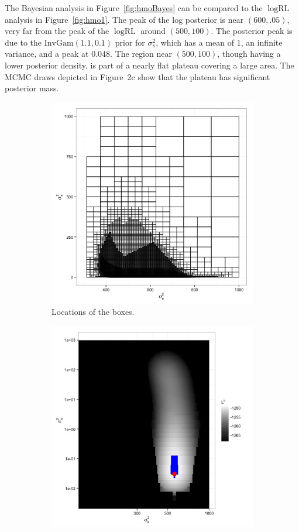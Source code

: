 \documentclass[ejs]{imsart}
\newcommand{\IG}{\text{InvGam}}
\newcommand{\RLorig}{\text{RL}}
\newcommand{\logRLorig}{\log\RLorig}
\newcommand{\sigssq}{\sigma_s^2}
\begin{document}
The Bayesian analysis in Figure~\ref{fig:hmoBayes} can be compared to the $\logRLorig$ analysis in Figure~\ref{fig:hmo1}.  The peak of the log posterior is near $(600, .05)$, very far from the peak of the $\logRLorig$ around $(500,100)$.  The posterior peak is due to the $\IG(1.1,0.1)$ prior for $\sigssq$, which has a mean of 1, an infinite variance, and a peak at 0.048.  The region near $(500,100)$, though having a lower posterior density, is part of a nearly flat plateau covering a large area.  The MCMC draws depicted in \cite{henn&hodges:2014} Figure~2c show that the plateau has significant posterior mass.

\begin{figure}
  \begin{subfigure}{.5\textwidth}
	\centering
	\includegraphics[width=.8\linewidth]{figs/hmo_HH11Bayes_boxes.jpg}
	\caption{Locations of the boxes.}
	\label{fig:hmoBayesboxes}
  \end{subfigure}
  \begin{subfigure}{.5\textwidth}
	\centering
	\includegraphics[width=.8\linewidth]{figs/hmo_HH11Bayes_rll.jpg}

\end{subfigure}
\end{figure}
\end{document}
